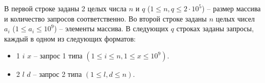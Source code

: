 В первой строке заданы 2 целых числа $n$ и $q$ ($1 \le n,q \le 2 \cdot 10^5$) -- размер массива и количество запросов соответственно. 
Во второй строке заданы $n$ целых чисел $a_i$ ($1 \le a_i \le 10^9$) -- элементы массива.
В следующих $q$ строках заданы запросы, каждый в одном из следующих форматов:
\begin{itemize}
\item 1 $i$ $x$ -- запрос 1 типа $(1 \le i \le n, 1 \le x \le 10^9)$.
\item 2 $l$ $d$ -- запрос 2 типа $(1 \le l, d \le n)$.~~
\end{itemize}